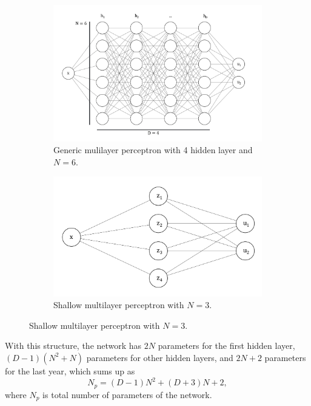 \begin{figure}[h!]
    \centering
    \begin{subfigure}[b]{0.45\textwidth}
        \includegraphics[width=\textwidth]{img/DeepMLP.png}
        \caption{Generic mulilayer perceptron with 4 hidden layer and $N=6$.}
        \label{fig:vpinndeepmlp}
    \end{subfigure}
    \hfill
    \begin{subfigure}[b]{0.45\textwidth}
        \includegraphics[width=\textwidth]{img/ShallowMLP.png}
        \caption{Shallow multilayer perceptron with $N=3$.}
        \label{fig:vpinnshallowmlp}
    \end{subfigure}
\end{figure}

With this structure, the network has $2N$ parameters for the first hidden layer, $(D-1)(N^2+N)$ parameters for other hidden layers, and $2N+2$ parameters for the last year, which sums up as
\begin{equation}
    \label{eq:vpinnsparameters}
    N_p = (D-1)N^2+(D+3)N+2,
\end{equation}
where $N_p$ is total number of parameters of the network.

